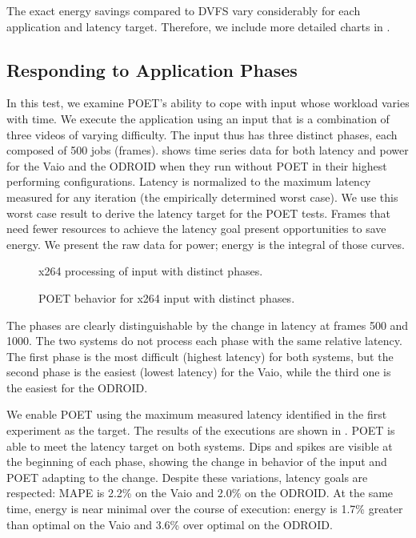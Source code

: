The exact energy savings compared to DVFS vary considerably for each application and latency target.
Therefore, we include more detailed charts in .


\subsection{Responding to Application Phases}
\label{sec:poet-eval-phases}

In this test, we examine POET's ability to cope with input whose workload varies with time.
We execute the  application using an input that is a combination of three videos of varying difficulty.
The input thus has three distinct phases, each composed of 500 jobs (frames).
 shows time series data for both latency and power for the Vaio and the ODROID when they run without POET in their highest performing configurations.
Latency is normalized to the maximum latency measured for any iteration (\ie the empirically determined worst case).
We use this worst case result to derive the latency target for the POET tests.
Frames that need fewer resources to achieve the latency goal present opportunities to save energy.
We present the raw data for power; energy is the integral of those curves.

\begin{figure}[t]
  \centering
  
  \caption{x264 processing of input with distinct phases.}
  \label{fig:poet-phases-default}
\end{figure}
\begin{figure}[t]
  \centering
      
  \caption{POET behavior for x264 input with distinct phases.}
  \label{fig:poet-phases-x264}
\end{figure}

The phases are clearly distinguishable by the change in latency at frames 500 and 1000.
The two systems do not process each phase with the same relative latency.
The first phase is the most difficult (highest latency) for both systems, but the second phase is the easiest (lowest latency) for the Vaio, while the third one is the easiest for the ODROID.

We enable POET using the maximum measured latency identified in the first experiment as the target.
The results of the executions are shown in .
POET is able to meet the latency target on both systems.
Dips and spikes are visible at the beginning of each phase, showing the change in behavior of the input and POET adapting to the change.
Despite these variations, latency goals are respected: MAPE is 2.2\% on the Vaio and 2.0\% on the ODROID.
At the same time, energy is near minimal over the course of execution: energy is 1.7\% greater than optimal on the Vaio and 3.6\% over optimal on the ODROID.


